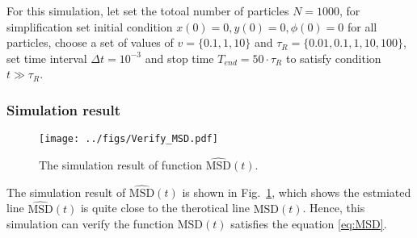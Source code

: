 \documentclass[runningheads]{llncs}
\begin{document}
\noindent For this simulation, let set the totoal number of particles $N=1000$, 
for simplification set initial condition $x(0)=0,y(0)=0,\phi(0)=0$ for all particles, 
choose a set of values of $v=\{0.1,1,10\}$ and $\tau_R=\{0.01,0.1,1,10,100\}$,
set time interval $\Delta t=10^{-3}$ 
and stop time $T_{end}=50\cdot\tau_R$ to satisfy condition $t\gg\tau_R$.
\subsubsection*{Simulation result}
\hfill\break

\begin{figure}
    \texttt{[image: ../figs/Verify\_MSD.pdf]}
    \caption{The simulation result of function $\widehat{\text{MSD}}(t)$.} \label{fig:MSD}
\end{figure}

\noindent The simulation result of $\widehat{\text{MSD}}(t)$ is shown in Fig.~\ref{fig:MSD}, 
which shows the estmiated line $\widehat{\text{MSD}}(t)$ is quite close to the therotical line $\text{MSD}(t)$.
Hence, this simulation can verify the function $\text{MSD}(t)$ satisfies the equation \eqref{eq:MSD}.

\end{document}

